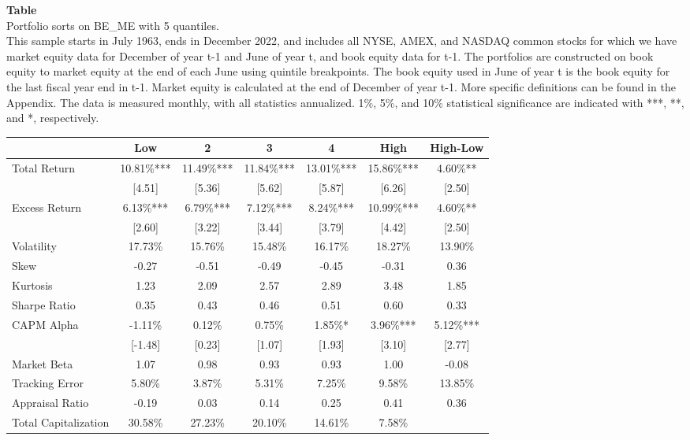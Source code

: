 \begin{table*}[ht!]
\raggedright
{}
\label{tab: quantile_sortBE_ME_with_5_quantiles}
\textbf{Table \thetable} \\
Portfolio sorts on BE\_ME with 5 quantiles. \\
\hspace*{1em}This sample starts in July 1963, ends in December 2022, and includes all NYSE, AMEX, and NASDAQ common stocks for which we have market equity data for December of year t-1 and June of year t, and book equity data for t-1. The portfolios are constructed on book equity to market equity at the end of each June using quintile breakpoints.  The book equity used in June of year t is the book equity for the last fiscal year end in t-1.  Market equity is calculated at the end of December of year t-1.  More specific definitions can be found in the Appendix.  The data is measured monthly, with all statistics annualized.  1\%, 5\%, and 10\% statistical significance are indicated with ***, **, and *, respectively. \\
\vspace{0.5em}
\centering
\begin{adjustbox}{max width=\textwidth}
\begin{tabular}{@{}lcccccc@{}}
\toprule
 & Low & 2 & 3 & 4 & High & High-Low \\
\midrule
Total Return & 10.81\%*** & 11.49\%*** & 11.84\%*** & 13.01\%*** & 15.86\%*** & 4.60\%** \\
 & [4.51] & [5.36] & [5.62] & [5.87] & [6.26] & [2.50] \\
Excess Return & 6.13\%*** & 6.79\%*** & 7.12\%*** & 8.24\%*** & 10.99\%*** & 4.60\%** \\
 & [2.60] & [3.22] & [3.44] & [3.79] & [4.42] & [2.50] \\
Volatility & 17.73\% & 15.76\% & 15.48\% & 16.17\% & 18.27\% & 13.90\% \\
Skew & -0.27 & -0.51 & -0.49 & -0.45 & -0.31 & 0.36 \\
Kurtosis & 1.23 & 2.09 & 2.57 & 2.89 & 3.48 & 1.85 \\
Sharpe Ratio & 0.35 & 0.43 & 0.46 & 0.51 & 0.60 & 0.33 \\
CAPM Alpha & -1.11\% & 0.12\% & 0.75\% & 1.85\%* & 3.96\%*** & 5.12\%*** \\
 & [-1.48] & [0.23] & [1.07] & [1.93] & [3.10] & [2.77] \\
Market Beta & 1.07 & 0.98 & 0.93 & 0.93 & 1.00 & -0.08 \\
Tracking Error & 5.80\% & 3.87\% & 5.31\% & 7.25\% & 9.58\% & 13.85\% \\
Appraisal Ratio & -0.19 & 0.03 & 0.14 & 0.25 & 0.41 & 0.36 \\
Total Capitalization & 30.58\% & 27.23\% & 20.10\% & 14.61\% & 7.58\% &  \\
\bottomrule
\end{tabular}
\end{adjustbox}
\end{table*}